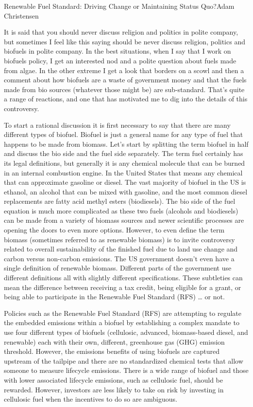 \documentclass{papertex}
\begin{document}
\begin{news}{2}{Renewable Fuel Standard: Driving Change or Maintaining Status 
    Quo?}{Adam Christensen}{}{}

It is said that you should never discuss religion and politics in polite 
company, but sometimes I feel like this saying should be never discuss 
religion, politics and biofuels in polite company. In the best situations, 
when I say that I work on biofuels policy, I get an interested nod and a 
polite question about fuels made from algae. In the other extreme I get a 
look that borders on a scowl and then a comment about how biofuels are a 
waste of government money and that the fuels made from bio sources (whatever 
those might be) are sub-standard. That’s quite a range of reactions, and one 
that has motivated me to dig into the details of this controversy.

To start a rational discussion it is first necessary to say that there are many 
different types of biofuel. Biofuel is just a general name for any type of fuel 
that happens to be made from biomass. Let’s start by splitting the term biofuel 
in half and discuss the bio side and the fuel side separately. The term fuel 
certainly has its legal definitions, but generally it is any chemical molecule 
that can be burned in an internal combustion engine. In the United States that 
means any chemical that can approximate gasoline or diesel. The vast majority 
of biofuel in the US is ethanol, an alcohol that can be mixed with gasoline, 
and the most common diesel replacements are fatty acid methyl esters 
(biodiesels). The bio side of the fuel equation is much more complicated as 
these two fuels (alcohols and biodiesels) can be made from a variety of biomass 
sources and newer scientific processes are opening the doors to even more 
options. However, to even define the term biomass (sometimes referred to as 
renewable biomass) is to invite controversy related to overall sustainability 
of the finished fuel due to land use change and carbon versus non-carbon 
emissions. The US government doesn’t even have a single definition of 
renewable biomass. Different parts of the government use different definitions 
all with slightly different specifications. These subtleties can mean the 
difference between receiving a tax credit, being eligible for a grant, or 
being able to participate in the Renewable Fuel Standard (RFS) … or not.

Policies such as the Renewable Fuel Standard (RFS) are attempting to regulate 
the embedded emissions within a biofuel by establishing a complex mandate to 
use four different types of biofuels (cellulosic, advanced, biomass-based 
diesel, and renewable) each with their own, different, greenhouse gas (GHG) 
emission threshold. However, the emissions benefits of using biofuels are 
captured upstream of the tailpipe and there are no standardized chemical tests 
that allow someone to measure lifecycle emissions. There is a wide range of 
biofuel and those with lower associated lifecycle emissions, such as cellulosic 
fuel, should be rewarded. However, investors are less likely to take on risk 
by investing in cellulosic fuel when the incentives to do so are ambiguous.


\end{news}
\end{document}
